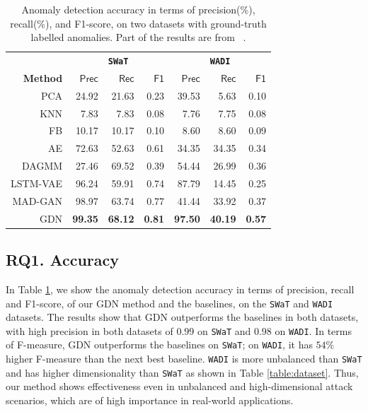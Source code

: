 \documentclass[letterpaper]{article} %
\begin{document}
\begin{table}[t]
    \centering\fontsize{9}{11}\selectfont
    \begin{tabular}{rrrrrrr}
        \toprule
          & \multicolumn{3}{c}{\textbf{\texttt{SWaT}}} & \multicolumn{3}{c}{\textbf{\texttt{WADI}}} \\
         \cmidrule(r){2-4} \cmidrule(r){5-7}
         \textbf{Method} & $\mathbf{\mathsf{Prec}}$ & $\mathbf{\mathsf{Rec}}$ & $\mathbf{\mathsf{F1}}$ & $\mathbf{\mathsf{Prec}}$ & $\mathbf{\mathsf{Rec}}$ & $\mathbf{\mathsf{F1}}$ \\
         \midrule
         \textsc{PCA} & 24.92 & 21.63 & 0.23 & 39.53 & 5.63 & 0.10 \\
         \textsc{KNN} & 7.83 & 7.83 & 0.08 & 7.76 & 7.75 & 0.08 \\
         \textsc{FB}  & 10.17 & 10.17 & 0.10 & 8.60 & 8.60 & 0.09 \\
         \textsc{AE} & 72.63 & 52.63 & 0.61 & 34.35 & 34.35 & 0.34 \\
         \textsc{\footnotesize{DAGMM}} & 27.46 & 69.52 & 0.39 & 54.44 & 26.99 & 0.36 \\
         \textsc{\footnotesize{LSTM-VAE}} & 96.24 & 59.91 & 0.74 & 87.79 & 14.45 & 0.25 \\
         \textsc{\footnotesize{MAD-GAN}} & 98.97 & 63.74 & 0.77 & 41.44 & 33.92 & 0.37 \\
         \midrule
         \textsc{GDN} & \textbf{99.35} & \textbf{68.12} & \textbf{0.81} &\textbf{97.50} & \textbf{40.19} & \textbf{0.57} \\
         \bottomrule
    \end{tabular}%
    \caption{Anomaly detection accuracy in terms of precision(\%), recall(\%), and F1-score, on two datasets with ground-truth labelled anomalies. Part of the results are from ~\cite{li2019mad}.}
    \label{tab:performance}
\end{table}

\subsection{RQ1. Accuracy}
In Table \ref{tab:performance}, we show the anomaly detection accuracy in terms of precision, recall and F1-score, of our \textsc{GDN} method and the baselines, on the \texttt{SWaT} and \texttt{WADI} datasets. The results show that \textsc{GDN} outperforms the baselines in both datasets, with high precision in both datasets of $0.99$ on \texttt{SWaT} and $0.98$ on \texttt{WADI}. In terms of F-measure, \textsc{GDN} outperforms the baselines on \texttt{SWaT}; on \texttt{WADI}, it has $54\%$ higher F-measure than the next best baseline. \texttt{WADI} is more unbalanced than \texttt{SWaT} and has higher dimensionality than \texttt{SWaT} as shown in Table \ref{table:dataset}. Thus, our method shows effectiveness even in unbalanced and high-dimensional attack scenarios, which are of high importance in real-world applications.
\end{document}
